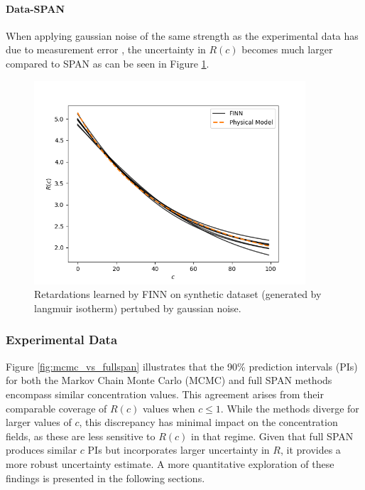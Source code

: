 \documentclass{article}
\begin{document}
\paragraph{Data-SPAN}
When applying gaussian noise of the same strength as the experimental data has due to measurement error \cite{nowak2016entropy}, the uncertainty in $R(c)$ becomes much larger compared to SPAN as can be seen in Figure \ref{fig:synthetic_langmuir_c_noise}.

\begin{figure}
    \centering
    \includegraphics[width=0.9\textwidth]{figs/finn_synthetic_langmuir_c_noise.png}
    \caption{Retardations learned by FINN on synthetic dataset (generated by langmuir isotherm) pertubed by gaussian noise.}
    \label{fig:synthetic_langmuir_c_noise}
\end{figure}



\subsubsection{Experimental Data}

Figure \ref{fig:mcmc_vs_fullspan} illustrates that the 90\% prediction intervals (PIs) for both the Markov Chain Monte Carlo (MCMC) and full SPAN methods encompass similar concentration values. This agreement arises from their comparable coverage of $R(c)$ values when $c \leq 1$. While the methods diverge for larger values of $c$, this discrepancy has minimal impact on the concentration fields, as these are less sensitive to $R(c)$ in that regime. Given that full SPAN produces similar $c$ PIs but incorporates larger uncertainty in $R$, it provides a more robust uncertainty estimate. A more quantitative exploration of these findings is presented in the following sections.
\end{document}
